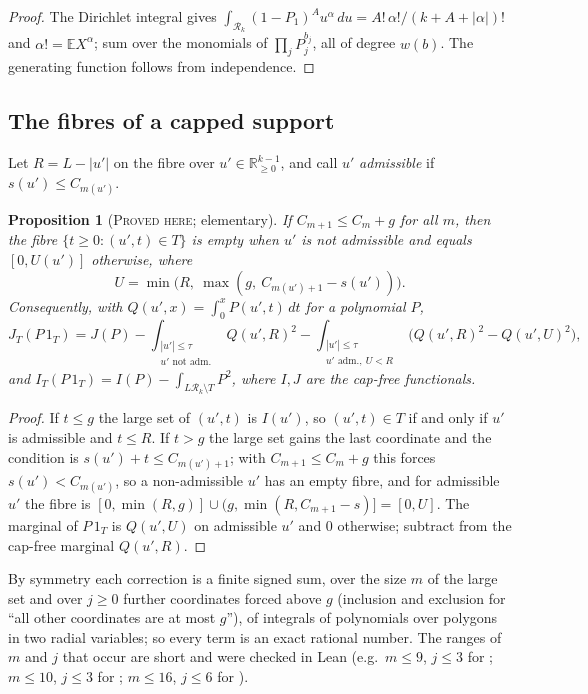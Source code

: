 \documentclass[11pt]{amsart}
\newtheorem{proposition}[theorem]{Proposition}
\theoremstyle{definition}
\theoremstyle{remark}
\newcommand{\lbl}[1]{\textup{\textsc{#1}}}
\newcommand{\R}{\mathcal{R}}
\begin{document}
\begin{proof}
The Dirichlet integral gives $\int_{\R_k}(1-P_1)^Au^\alpha\,du=A!\,\alpha!/(k+A+|\alpha|)!$
and $\alpha!=\mathbb EX^\alpha$; sum over the monomials of $\prod_jP_j^{b_j}$,
all of degree $w(b)$. The generating function follows from independence.
\end{proof}

\subsection*{The fibres of a capped support}
Let $R=L-|u'|$ on the fibre over $u'\in\mathbb R^{k-1}_{\ge0}$, and call $u'$
\emph{admissible} if $s(u')\le C_{m(u')}$.

\begin{proposition}[\lbl{Proved here}; elementary]\label{prop:fibre}
If $C_{m+1}\le C_m+g$ for all $m$, then the fibre $\{t\ge0:(u',t)\in T\}$ is
empty when $u'$ is not admissible and equals $[0,U(u')]$ otherwise, where
\[
U=\min\bigl(R,\ \max(g,\ C_{m(u')+1}-s(u'))\bigr).
\]
Consequently, with $Q(u',x)=\int_0^xP(u',t)\,dt$ for a polynomial $P$,
\[
J_T(P\,1_T)=J(P)-\int_{\substack{|u'|\le\tau\\ u'\text{ not adm.}}}Q(u',R)^2
-\int_{\substack{|u'|\le\tau\\ u'\text{ adm.},\ U<R}}\bigl(Q(u',R)^2-Q(u',U)^2\bigr),
\]
and $I_T(P\,1_T)=I(P)-\int_{L\R_k\setminus T}P^2$, where $I,J$ are the
cap-free functionals.
\end{proposition}

\begin{proof}
If $t\le g$ the large set of $(u',t)$ is $I(u')$, so $(u',t)\in T$ if and only
if $u'$ is admissible and $t\le R$. If $t>g$ the large set gains the last
coordinate and the condition is $s(u')+t\le C_{m(u')+1}$; with
$C_{m+1}\le C_m+g$ this forces $s(u')<C_{m(u')}$, so a non-admissible $u'$ has
an empty fibre, and for admissible $u'$ the fibre is
$[0,\min(R,g)]\cup(g,\min(R,C_{m+1}-s)]=[0,U]$. The marginal of $P\,1_T$ is
$Q(u',U)$ on admissible $u'$ and $0$ otherwise; subtract from the cap-free
marginal $Q(u',R)$.
\end{proof}

By symmetry each correction is a finite signed sum, over the size $m$ of the
large set and over $j\ge0$ further coordinates forced above $g$ (inclusion and
exclusion for ``all other coordinates are at most $g$''), of integrals of
polynomials over polygons in two radial variables; so every term is an exact
rational number. The ranges of $m$ and $j$ that occur are short and were
checked in Lean (e.g.\ $m\le9$, $j\le3$ for \cite{Sta26}; $m\le10$, $j\le3$
for \cite{Kin26}; $m\le16$, $j\le6$ for \cite{Cha26}).
\end{document}
